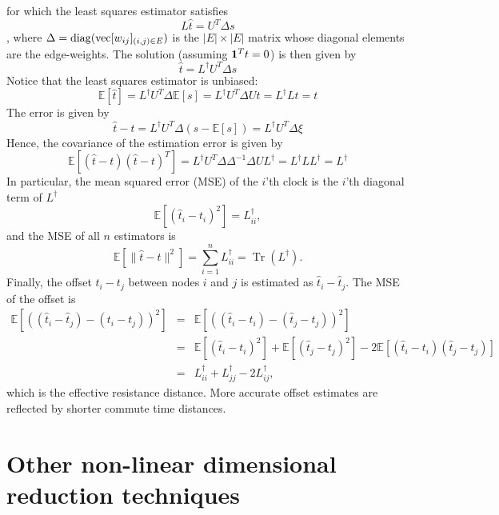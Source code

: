 for which the least squares estimator satisfies
$$L \hat{t} = U^T \Delta s$$,
where $\Delta = \operatorname{diag}(\mathrm{vec}[w_{ij}]_{(i,j)\in E})$ is the $|E|\times |E|$ matrix whose diagonal elements are the edge-weights. The solution (assuming $\mathbf{1}^T t = 0$) is then given by
\begin{equation}
\hat{t} = L^\dagger U^T \Delta s
\end{equation} 
Notice that the least squares estimator is unbiased: 
\begin{equation}
\mathbb{E}[\hat{t}] = L^\dagger U^T \Delta \mathbb{E}[s] = L^\dagger U^T \Delta Ut = L^\dagger L t = t
\end{equation}
The error is given by
\begin{equation}
\hat{t} - t = L^\dagger U^T \Delta (s - \mathbb{E}[s]) = L^\dagger U^T \Delta \xi 
\end{equation}
Hence, the covariance of the estimation error is given by
\begin{equation}
\mathbb{E}[(\hat{t} - t)(\hat{t}-t)^T] = L^\dagger U^T \Delta \Delta^{-1} \Delta U L^\dagger = L^\dagger L L^\dagger = L^\dagger
\end{equation}
In particular, the mean squared error (MSE) of the $i$'th clock is the $i$'th diagonal term of $L^\dagger$
\begin{equation}
\mathbb{E}[(\hat{t}_i - t_i)^2] = L^\dagger_{ii},
\end{equation}
and the MSE of all $n$ estimators is
\begin{equation}
\mathbb{E}[\|\hat{t} -  t\|^2] = \sum_{i=1}^n L^\dagger_{ii} = \operatorname{Tr}(L^\dagger).
\end{equation}
Finally, the offset $t_i-t_j$ between nodes $i$ and $j$ is estimated as $\hat{t}_i - \hat{t}_j$. The MSE of the offset is
\begin{eqnarray}
\mathbb{E}[((\hat{t}_i - \hat{t}_j) - (t_i - t_j))^2] &=& \mathbb{E}[((\hat{t}_i - t_i) - (\hat{t}_j - t_j))^2] \nonumber \\
&=& \mathbb{E}[(\hat{t}_i - t_i)^2] + \mathbb{E}[(\hat{t}_j - t_j)^2] - 2\mathbb{E}[(\hat{t}_i - t_i)(\hat{t}_j - t_j)] \nonumber \\
&=& L^\dagger_{ii} + L^\dagger_{jj} - 2L^\dagger_{ij},
\end{eqnarray}
which is the effective resistance distance. More accurate offset estimates are reflected by shorter commute time distances.


\section{Other non-linear dimensional reduction techniques}


